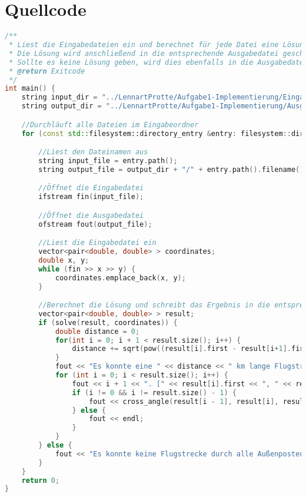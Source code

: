 \documentclass[a4paper,10pt,ngerman]{scrartcl}
\begin{document}
    \section{Quellcode}
    \label{sec:quellcode}
    \label{LastPage}
    \begin{lstlisting}[frame=single,language=C++,title=Methode main,breaklines=true,label={lst:code_main}]
/**
 * Liest die Eingabedateien ein und berechnet für jede Datei eine Lösung entsprechend der Aufgabenstellung.
 * Die Lösung wird anschließend in die entsprechende Ausgabedatei geschrieben.
 * Sollte es keine Lösung geben, wird dies ebenfalls in die Ausgabedatei geschrieben.
 * @return Exitcode
 */
int main() {
    string input_dir = "../LennartProtte/Aufgabe1-Implementierung/Eingabedateien";
    string output_dir = "../LennartProtte/Aufgabe1-Implementierung/Ausgabedateien";

    //Durchläuft alle Dateien im Eingabeordner
    for (const std::filesystem::directory_entry &entry: filesystem::directory_iterator(input_dir)) {

        //Liest den Dateinamen aus
        string input_file = entry.path();
        string output_file = output_dir + "/" + entry.path().filename().string();

        //Öffnet die Eingabedatei
        ifstream fin(input_file);

        //Öffnet die Ausgabedatei
        ofstream fout(output_file);

        //Liest die Eingabedatei ein
        vector<pair<double, double> > coordinates;
        double x, y;
        while (fin >> x >> y) {
            coordinates.emplace_back(x, y);
        }

        //Berechnet die Lösung und schreibt das Ergebnis in die entsprechende Ausgabedatei
        vector<pair<double, double> > result;
        if (solve(result, coordinates)) {
            double distance = 0;
            for(int i = 0; i + 1 < result.size(); i++) {
                distance += sqrt(pow((result[i].first - result[i+1].first), 2.0) + (pow((result[i].second - result[i+1].second), 2.0)));
            }
            fout << "Es konnte eine " << distance << " km lange Flugstrecke durch alle Außenposten ermittelt werden." << endl;
            for (int i = 0; i < result.size(); i++) {
                fout << i + 1 << ". [" << result[i].first << ", " << result[i].second << "] ";
                if (i != 0 && i != result.size() - 1) {
                    fout << cross_angle(result[i - 1], result[i], result[i + 1]) << "° " << endl;
                } else {
                    fout << endl;
                }
            }
        } else {
            fout << "Es konnte keine Flugstrecke durch alle Außenposten ermittelt werden." << endl;
        }
    }
    return 0;
}
    \end{lstlisting}
\end{document}
